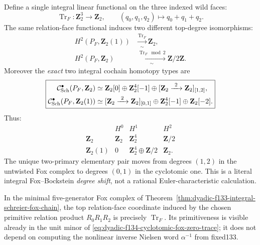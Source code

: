 \begin{theorem}
\label{thm:dyadic-f134-top-trace-bockstein-shift}
Define a single
integral linear
functional on the
three indexed
wild faces:
\begin{equation}\label{eq:dyadic-f134-primitive-top-functional}
\boxed{\qquad
\operatorname{Tr}_F:
\mathbf Z_2^3\longrightarrow\mathbf Z_2,
\qquad
(q_0,q_1,q_2)\longmapsto q_0+q_1+q_2.
\qquad}
\end{equation}
The same relation-face
functional induces
two different
top-degree isomorphisms:
\begin{equation}\label{eq:dyadic-f134-top-class-identifications}
\boxed{
\begin{aligned}
H^2(P_F,\mathbf Z_2(1))
&\xrightarrow[\sim]{\operatorname{Tr}_F}
\mathbf Z_2,\\
H^2(P_F,\mathbf Z_2)
&\xrightarrow[\sim]{\operatorname{Tr}_F\bmod2}
\mathbf Z/2\mathbf Z.
\end{aligned}}
\end{equation}
Moreover the
\emph{exact} two
integral cochain
homotopy types are
\begin{equation}\label{eq:dyadic-f134-twisted-untwisted-normal-forms}
\boxed{
\begin{aligned}
\mathcal C_{\rm Sch}^\bullet(P_F,\mathbf Z_2)
\simeq{}&
\mathbf Z_2[0]\oplus
\mathbf Z_2^4[-1]\oplus
[\mathbf Z_2\xrightarrow{\ 2\ }
 \mathbf Z_2]_{[1,2]},\\
\mathcal C_{\rm Sch}^\bullet(P_F,\mathbf Z_2(1))
\simeq{}&
[\mathbf Z_2\xrightarrow{\ 2\ }
 \mathbf Z_2]_{[0,1]}
\oplus\mathbf Z_2^4[-1]
\oplus\mathbf Z_2[-2].
\end{aligned}}
\end{equation}
Thus:
\begin{equation}\label{eq:dyadic-f134-h0h1h2-explicit}
\boxed{
\begin{array}{c|ccc}
&H^0&H^1&H^2\\ \hline
\mathbf Z_2&
\mathbf Z_2&
\mathbf Z_2^4&
\mathbf Z/2\\
\mathbf Z_2(1)&
0&
\mathbf Z_2^4\oplus\mathbf Z/2&
\mathbf Z_2 .
\end{array}}
\end{equation}
The unique two-primary
elementary pair
moves from
degrees $(1,2)$
in the untwisted
Fox complex to
degrees $(0,1)$
in the cyclotomic
one.  This is a
literal integral
Fox--Bockstein
\emph{degree shift},
not a rational
Euler-characteristic
calculation.

In the minimal
five-generator Fox
complex of
Theorem~\ref{thm:dyadic-f133-integral-schreier-fox-chain},
the top relation-face
coordinate induced by
the chosen primitive
relation product
$R_0R_1R_2$ is
precisely
$\operatorname{Tr}_F$.
Its primitiveness is
visible already
in the unit minor
of
\eqref{eq:dyadic-f134-cyclotomic-fox-zero-trace};
it does not depend
on computing the
nonlinear inverse
Nielsen word
$\alpha^{-1}$
from fixed133.
\end{theorem}

